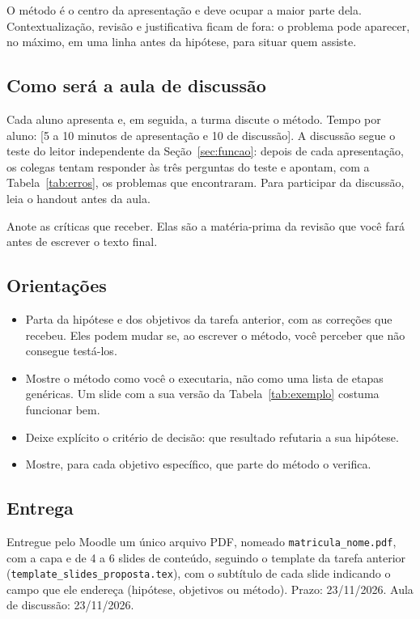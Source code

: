 \documentclass[10pt,a4paper]{extarticle}
\newcommand{\prazo}{\textcolor{red!70!black}{23/11/2026}}
\newcommand{\dataaula}{\textcolor{red!70!black}{23/11/2026}}
\newcommand{\tempoapres}{\textcolor{red!70!black}{[5 a 10 minutos de apresentação e 10 de discussão]}}
\theoremstyle{definition}
\begin{document}
O método é o centro da apresentação e deve ocupar a maior parte dela. Contextualização, revisão e justificativa ficam de fora: o problema pode aparecer, no máximo, em uma linha antes da hipótese, para situar quem assiste.

\subsection{Como será a aula de discussão}

Cada aluno apresenta e, em seguida, a turma discute o método. Tempo por aluno: \tempoapres. A discussão segue o teste do leitor independente da Seção~\ref{sec:funcao}: depois de cada apresentação, os colegas tentam responder às três perguntas do teste e apontam, com a Tabela~\ref{tab:erros}, os problemas que encontraram. Para participar da discussão, leia o handout antes da aula.

Anote as críticas que receber. Elas são a matéria-prima da revisão que você fará antes de escrever o texto final.

\subsection{Orientações}

\begin{itemize}
  \item Parta da hipótese e dos objetivos da tarefa anterior, com as correções que recebeu. Eles podem mudar se, ao escrever o método, você perceber que não consegue testá-los.
  \item Mostre o método como você o executaria, não como uma lista de etapas genéricas. Um slide com a sua versão da Tabela~\ref{tab:exemplo} costuma funcionar bem.
  \item Deixe explícito o critério de decisão: que resultado refutaria a sua hipótese.
  \item Mostre, para cada objetivo específico, que parte do método o verifica.
\end{itemize}

\subsection{Entrega}

Entregue pelo Moodle um único arquivo PDF, nomeado \texttt{matricula\_nome.pdf}, com a capa e de 4 a 6 slides de conteúdo, seguindo o template da tarefa anterior (\texttt{template\_slides\_proposta.tex}), com o subtítulo de cada slide indicando o campo que ele endereça (hipótese, objetivos ou método). Prazo: \prazo. Aula de discussão: \dataaula.
\end{document}
